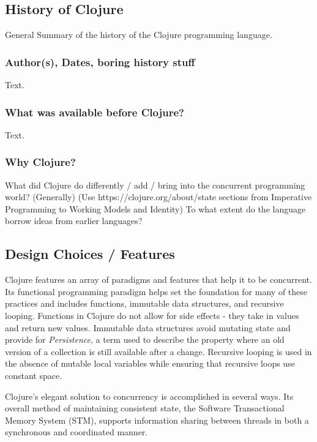 \subsection{History of Clojure}
    General Summary of the history of the Clojure programming language.
    
\subsubsection{Author(s), Dates, boring history stuff}

    Text.

\subsubsection{What was available before Clojure?}

    Text.

\subsubsection{Why Clojure?}

    What did Clojure do differently / add / bring into the concurrent programming world? (Generally)
        (Use https://clojure.org/about/state sections from Imperative Programming to Working Models and Identity)
    To what extent do the language borrow ideas from earlier languages?
    
\subsection{Design Choices / Features}
    
   Clojure features an array of paradigms and features that help it to be concurrent. Its functional programming paradigm helps set the foundation for many of these practices and includes functions, immutable data structures, and recursive looping. Functions in Clojure do not allow for side effects - they take in values and return new values. Immutable data structures avoid mutating state and provide for \textit{Persistence}, a term used to describe the property where an old version of a collection is still available after a change. Recursive looping is used in the absence of mutable local variables while ensuring that recursive loops use constant space.
    
    Clojure's elegant solution to concurrency is accomplished in several ways. Its overall method of maintaining consistent state, the Software Transactional Memory System (STM), supports information sharing between threads in both  a synchronous and coordinated manner.
    
